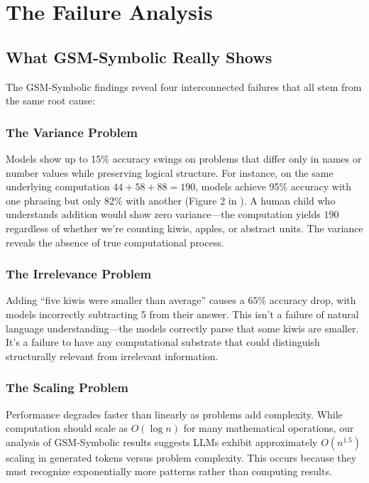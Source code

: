 \documentclass[11pt,letterpaper]{article}
\theoremstyle{plain}
\theoremstyle{definition}
\theoremstyle{remark}
\begin{document}
\section{The Failure Analysis}
\label{sec:failures}

\subsection{What GSM-Symbolic Really Shows}

The GSM-Symbolic findings reveal four interconnected failures that all stem from the same root cause:

\subsubsection{The Variance Problem}
\label{sec:variance}
Models show up to 15\% accuracy swings on problems that differ only in names or number values while preserving logical structure. For instance, on the same underlying computation $44 + 58 + 88 = 190$, models achieve 95\% accuracy with one phrasing but only 82\% with another (Figure 2 in \cite{mirzadeh2024gsm}). A human child who understands addition would show zero variance—the computation yields $190$ regardless of whether we're counting kiwis, apples, or abstract units. The variance reveals the absence of true computational process.

\subsubsection{The Irrelevance Problem}
\label{sec:irrelevance}  
Adding ``five kiwis were smaller than average'' causes a 65\% accuracy drop, with models incorrectly subtracting 5 from their answer. This isn't a failure of natural language understanding—the models correctly parse that some kiwis are smaller. It's a failure to have any computational substrate that could distinguish structurally relevant from irrelevant information.

\subsubsection{The Scaling Problem}
\label{sec:scaling}
Performance degrades faster than linearly as problems add complexity. While computation should scale as $O(\log n)$ for many mathematical operations, our analysis of GSM-Symbolic results suggests LLMs exhibit approximately $O(n^{1.5})$ scaling in generated tokens versus problem complexity. This occurs because they must recognize exponentially more patterns rather than computing results.
\end{document}
